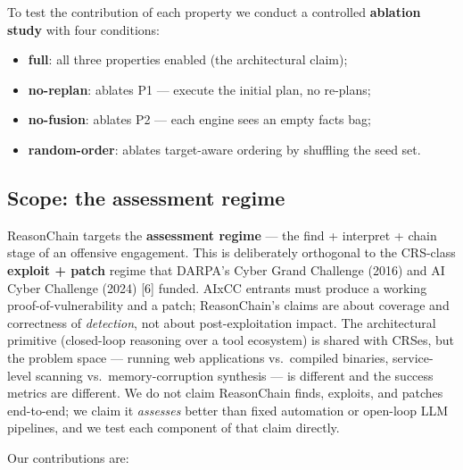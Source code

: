 \documentclass[
]{article}
\providecommand{\tightlist}{%
  \setlength{\itemsep}{0pt}\setlength{\parskip}{0pt}}
\begin{document}
To test the contribution of each property we conduct a controlled
\textbf{ablation study} with four conditions:

\begin{itemize}
\tightlist
\item
  \textbf{full}: all three properties enabled (the architectural claim);
\item
  \textbf{no-replan}: ablates P1 --- execute the initial plan, no
  re-plans;
\item
  \textbf{no-fusion}: ablates P2 --- each engine sees an empty facts
  bag;
\item
  \textbf{random-order}: ablates target-aware ordering by shuffling the
  seed set.
\end{itemize}

\subsection{Scope: the assessment
regime}\label{scope-the-assessment-regime}

ReasonChain targets the \textbf{assessment regime} --- the find +
interpret + chain stage of an offensive engagement. This is deliberately
orthogonal to the CRS-class \textbf{exploit + patch} regime that DARPA's
Cyber Grand Challenge (2016) and AI Cyber Challenge (2024) {[}6{]}
funded. AIxCC entrants must produce a working proof-of-vulnerability and
a patch; ReasonChain's claims are about coverage and correctness of
\emph{detection}, not about post-exploitation impact. The architectural
primitive (closed-loop reasoning over a tool ecosystem) is shared with
CRSes, but the problem space --- running web applications vs.~compiled
binaries, service-level scanning vs.~memory-corruption synthesis --- is
different and the success metrics are different. We do not claim
ReasonChain finds, exploits, and patches end-to-end; we claim it
\emph{assesses} better than fixed automation or open-loop LLM pipelines,
and we test each component of that claim directly.

Our contributions are:
\end{document}
